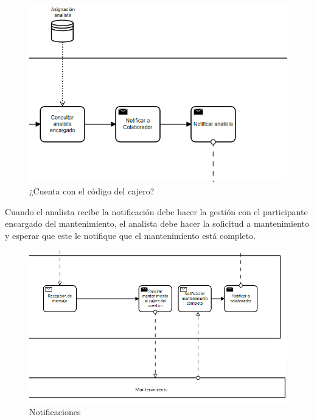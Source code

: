 \begin{figure}[H]
	\centering
	\includegraphics[scale=0.5]{Capitulo3/imagenes/2.png}
	\caption{¿Cuenta con el código del cajero?}
	\label{CodCaj2}
\end{figure}

Cuando el analista recibe la notificación debe hacer la gestión con el participante encargado del mantenimiento, el analista debe hacer la solicitud a mantenimiento y esperar que este le notifique que el mantenimiento está completo.

\begin{figure}[H]
	\centering
	\includegraphics[scale=0.5]{Capitulo3/imagenes/3.png}
	\caption{Notificaciones}
	\label{notificaciones}
\end{figure}

